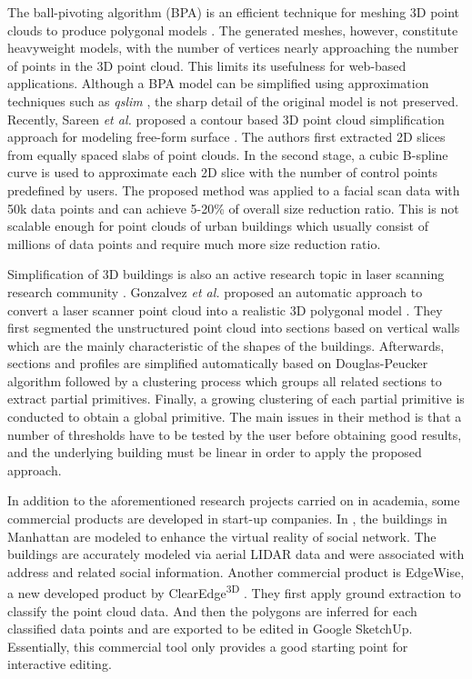 The ball-pivoting algorithm (BPA) is an efficient technique
for meshing 3D point clouds to produce polygonal models \cite{BPA_BMRS}.
The generated meshes, however, constitute heavyweight models,
with the number of vertices nearly approaching the number of points in the
3D point cloud.
This limits its usefulness for web-based applications.
Although a BPA model can be simplified using approximation techniques such as
{\it qslim} \cite{BPA_GH},
the sharp detail of the original model is not preserved.
Recently, Sareen {\it et al.} proposed a contour based 3D point cloud
simplification approach for modeling free-form surface \cite{RW_SKC}.
The authors first extracted 2D slices from equally spaced slabs of point clouds.
In the second stage, a cubic B-spline curve is used to approximate
each 2D slice with the number of control points predefined by users.
The proposed method was applied to a facial scan data with 50k
data points and can achieve 5-20\% of overall size reduction ratio.
This is not scalable enough for point clouds of urban buildings which usually
consist of millions of data points and require much more size reduction ratio.


Simplification of 3D buildings is also an active research topic in
laser scanning research community \cite{LS_GAL,WDD_BBH,LS_BH}.
Gonzalvez {\it et al.} proposed an automatic approach to convert
a laser scanner point cloud into a realistic 3D polygonal model \cite{LS_GAL}.
They first segmented the unstructured point cloud into sections
based on vertical walls which are the
mainly characteristic of the shapes of the buildings.
Afterwards, sections and profiles are simplified automatically
based on Douglas-Peucker algorithm followed by a clustering process
which groups all related sections to extract partial primitives.
Finally, a growing clustering of each partial primitive is conducted
to obtain a global primitive.
The main issues in their method is that a number of thresholds
 have to be tested by the user before obtaining good results,
and the underlying building must be linear
in order to apply the proposed approach.

In addition to the aforementioned research projects carried on in academia,
some commercial products are developed in start-up companies.
In \cite{IND_YC}, the buildings in Manhattan are modeled to enhance
the virtual reality of social network.
The buildings are accurately modeled via aerial LIDAR data
and were associated with address and related social information.
Another commercial product is EdgeWise\textsuperscript{\texttrademark},
a new developed product by ClearEdge\textsuperscript{3D} \cite{IND_EW}.
They first apply ground extraction to classify the point cloud data.
And then the polygons are inferred for each classified data points
and are exported to be edited in Google SketchUp.
Essentially, this commercial tool only provides
a good starting point for interactive editing.

